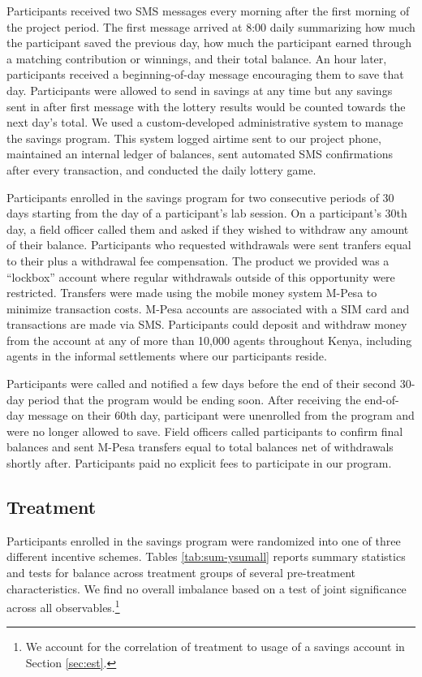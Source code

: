 \documentclass[11pt]{article}
\begin{document}
		Participants received two SMS messages every morning after the first morning of the project period. The first message arrived at 8:00 daily summarizing how much the participant saved the previous day, how much the participant earned through a matching contribution or winnings, and their total balance. An hour later, participants received a beginning-of-day message encouraging them to save that day. Participants were allowed to send in savings at any time but any savings sent in after first message with the lottery results would be counted towards the next day's total. We used a custom-developed administrative system to manage the savings program. This system logged airtime sent to our project phone, maintained an internal ledger of balances, sent automated SMS confirmations after every transaction, and conducted the daily lottery game.

		Participants enrolled in the savings program for two consecutive periods of 30 days starting from the day of a participant's lab session. On a participant's 30th day, a field officer called them and asked if they wished to withdraw any amount of their balance. Participants who requested withdrawals were sent tranfers equal to their plus a withdrawal fee compensation. The product we provided was a ``lockbox'' account where regular withdrawals outside of this opportunity were restricted. Transfers were made using the mobile money system M-Pesa to minimize transaction costs. M-Pesa accounts are associated with a SIM card and transactions are made via SMS. Participants could deposit and withdraw money from the account at any of more than 10,000 agents throughout Kenya, including agents in the informal settlements where our participants reside.

		Participants were called and notified a few days before the end of their second 30-day period that the program would be ending soon. After receiving the end-of-day message on their 60th day, participant were unenrolled from the program and were no longer allowed to save. Field officers called participants to confirm final balances and sent M-Pesa transfers equal to total balances net of withdrawals shortly after. Participants paid no explicit fees to participate in our program.

	\subsection{Treatment} \label{sec:treat}

		Participants enrolled in the savings program were randomized into one of three different incentive schemes. Tables \ref{tab:sum-ysumall} reports summary statistics and tests for balance across treatment groups of several pre-treatment characteristics. We find no overall  imbalance based on a test of joint significance across all observables.\footnote{We account for the correlation of treatment to usage of a savings account in Section \ref{sec:est}.}
\end{document}
